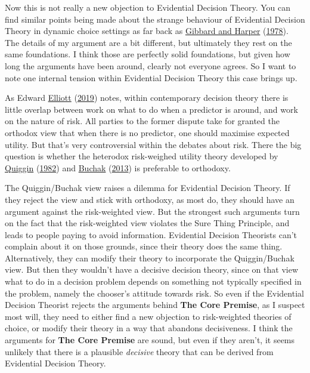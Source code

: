 \documentclass[
  12pt,
]{article}
\begin{document}
Now this is not really a new objection to Evidential Decision Theory.
You can find similar points being made about the strange behaviour of
Evidential Decision Theory in dynamic choice settings as far back as
\protect\hyperlink{ref-GibbardHarper1978}{Gibbard and Harper}
(\protect\hyperlink{ref-GibbardHarper1978}{1978}). The details of my
argument are a bit different, but ultimately they rest on the same
foundations. I think those are perfectly solid foundations, but given
how long the arguments have been around, clearly not everyone agrees. So
I want to note one internal tension within Evidential Decision Theory
this case brings up.

As Edward \protect\hyperlink{ref-Elliot2019}{Elliott}
(\protect\hyperlink{ref-Elliot2019}{2019}) notes, within contemporary
decision theory there is little overlap between work on what to do when
a predictor is around, and work on the nature of risk. All parties to
the former dispute take for granted the orthodox view that when there is
no predictor, one should maximise expected utility. But that's very
controversial within the debates about risk. There the big question is
whether the heterodox risk-weighed utility theory developed by
\protect\hyperlink{ref-Quiggin1982}{Quiggin}
(\protect\hyperlink{ref-Quiggin1982}{1982}) and
\protect\hyperlink{ref-BuchakRisk}{Buchak}
(\protect\hyperlink{ref-BuchakRisk}{2013}) is preferable to orthodoxy.

The Quiggin/Buchak view raises a dilemma for Evidential Decision Theory.
If they reject the view and stick with orthodoxy, as most do, they
should have an argument against the risk-weighted view. But the
strongest such arguments turn on the fact that the risk-weighted view
violates the Sure Thing Principle, and leads to people paying to avoid
information. Evidential Decision Theorists can't complain about it on
those grounds, since their theory does the same thing. Alternatively,
they can modify their theory to incorporate the Quiggin/Buchak view. But
then they wouldn't have a decisive decision theory, since on that view
what to do in a decision problem depends on something not typically
specified in the problem, namely the chooser's attitude towards risk. So
even if the Evidential Decision Theorist rejects the arguments behind
\textbf{The Core Premise}, as I suspect most will, they need to either
find a new objection to risk-weighted theories of choice, or modify
their theory in a way that abandons decisiveness. I think the arguments
for \textbf{The Core Premise} are sound, but even if they aren't, it
seems unlikely that there is a plausible \emph{decisive} theory that can
be derived from Evidential Decision Theory.
\end{document}
